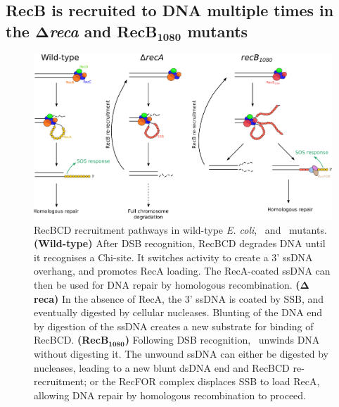 \subsection*{RecB is recruited to DNA multiple times in the $\mathbf{\Delta}$\emph{reca} and RecB$\mathbf{_{1080}}$ mutants}

\begin{figure}[htbp]
    \centering
    \includegraphics[width=\textwidth]{Figures/Fig_mutants_pathways.pdf}
    \caption{RecBCD recruitment pathways in wild-type \emph{E. coli}, \dreca\ and \geneteneighty\ mutants. \textbf{(Wild-type)} After DSB recognition, RecBCD degrades DNA until it recognises a Chi-site. It switches activity to create a 3' ssDNA overhang, and promotes RecA loading. The RecA-coated ssDNA can then be used for DNA repair by homologous recombination. \textbf{($\mathbf{\Delta}$reca)} In the absence of RecA, the 3' ssDNA is coated by SSB, and eventually digested by cellular nucleases. Blunting of the DNA end by digestion of the ssDNA creates a new substrate for binding of RecBCD. \textbf{(RecB$\mathbf{_{1080}}$)} Following DSB recognition, \teneighty\ unwinds DNA without digesting it. The unwound ssDNA can either be digested by nucleases, leading to a new blunt dsDNA end and RecBCD re-recruitment; or the RecFOR complex displaces SSB to load RecA, allowing DNA repair by homologous recombination to proceed.}
    \label{Fig:pathways}
\end{figure}

